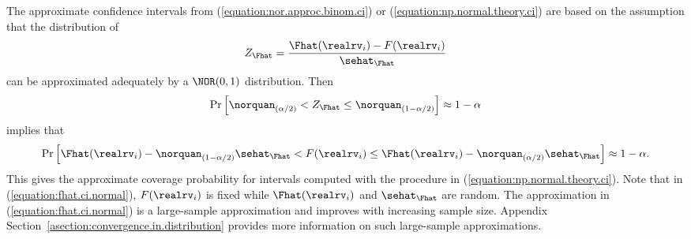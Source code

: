 The approximate confidence intervals 
from (\ref{equation:nor.approc.binom.ci}) or
(\ref{equation:np.normal.theory.ci}) are based on the assumption that
the distribution of
\begin{equation}
\label{equation:def.zfhat.normal}
Z_{\Fhat}  = 
\frac{\Fhat(\realrv_{i})-F(\realrv_{i})}
{\sehat_{\Fhat}}
\end{equation}
can be approximated adequately by a $\NOR(0,1)$ distribution.
Then 
\begin{equation}
\label{equation:prob.zfhat.normal}
\Pr \left[ \norquan_{(\alpha/2)} < Z_{\Fhat} \leq
	\norquan_{(1-\alpha/2)} \right]	\approx 1-\alpha
\end{equation}
implies that
\begin{equation}
\label{equation:fhat.ci.normal}
\Pr \left[  \Fhat(\realrv_{i}) - \norquan_{(1-\alpha/2)} 
	\sehat_{\Fhat}  <
	F(\realrv_{i})   \leq
	\Fhat(\realrv_{i}) - \norquan_{(\alpha/2)} 
	\sehat_{\Fhat} \right]
	\approx 1-\alpha.
\end{equation}
This gives the approximate coverage probability for intervals computed
with the procedure in (\ref{equation:np.normal.theory.ci}). Note that
in (\ref{equation:fhat.ci.normal}), $F(\realrv_{i})$ is fixed while
$\Fhat(\realrv_{i})$ and $\sehat_{\Fhat}$ are
random.  The approximation in (\ref{equation:fhat.ci.normal}) is a
large-sample approximation and improves with increasing sample
size. Appendix Section~\ref{asection:convergence.in.distribution} 
provides more information on such large-sample approximations.

